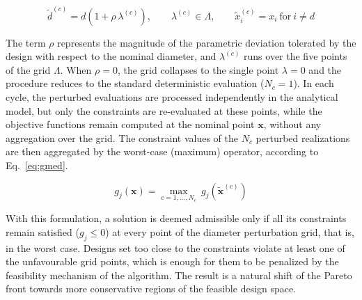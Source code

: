  \begin{equation}\tilde{d}^{(c)} = d\left(1 + \rho\,\lambda^{(c)}\right),\qquad \lambda^{(c)} \in \Lambda,\qquad \tilde{x}_i^{(c)} = x_i \ \text{for}\ i \neq d\label{eq:perturbacao}
 \end{equation}

The term $\rho$ represents the magnitude of the parametric deviation tolerated by the design with respect to the nominal diameter, and $\lambda^{(c)}$ runs over the five points of the grid $\Lambda$.
When $\rho = 0$, the grid collapses to the single point $\lambda = 0$ and the procedure reduces to the standard deterministic evaluation ($N_c = 1$).
In each cycle, the perturbed evaluations are processed independently in the analytical model, but only the constraints are re-evaluated at these points, while the objective functions remain computed at the nominal point $\mathbf{x}$, without any aggregation over the grid.
The constraint values of the $N_c$ perturbed realizations are then aggregated by the worst-case (maximum) operator, according to Eq.~\eqref{eq:gmed}.

 \begin{equation}g_j(\mathbf{x}) = \max_{c=1,\ldots,N_c}\ g_j\!\left(\tilde{\mathbf{x}}^{(c)}\right)
 \label{eq:gmed}
 \end{equation}

With this formulation, a solution is deemed admissible only if all its constraints remain satisfied ($g_j \leq 0$) at every point of the diameter perturbation grid, that is, in the worst case. Designs set too close to the constraints violate at least one of the unfavourable grid points, which is enough for them to be penalized by the feasibility mechanism of the algorithm.
The result is a natural shift of the Pareto front towards more conservative regions of the feasible design space.

